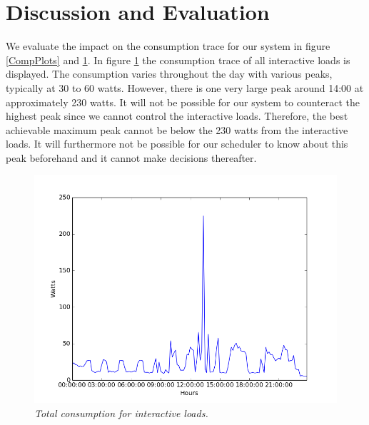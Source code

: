 \section{Discussion and Evaluation}
\label{sec:discussion}
We evaluate the impact on the consumption trace for our system in figure \ref{CompPlots} and \ref{interactiveLoads}. In figure \ref{interactiveLoads} the consumption trace of all interactive loads is displayed. The consumption varies throughout the day with various peaks, typically at 30 to 60 watts. However, there is one very large peak around 14:00 at approximately 230 watts. It will not be possible for our system to counteract the highest peak since we cannot control the interactive loads. Therefore, the best achievable maximum peak cannot be below the 230 watts from the interactive loads. It will furthermore not be possible for our scheduler to know about this peak beforehand and it cannot make decisions thereafter.

\begin{figure}[!ht]
\centering
\includegraphics[width=1.0\textwidth]{img/only_interactive.png}
\caption[Difference]{\emph{\small Total consumption for interactive loads.}}
\label{interactiveLoads}
\end{figure}

